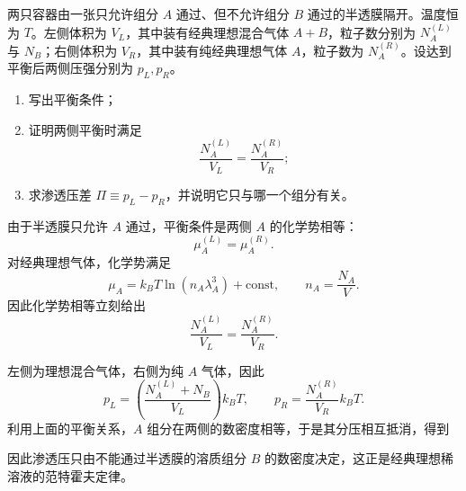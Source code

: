 \begin{question}
两只容器由一张只允许组分 $A$ 通过、但不允许组分 $B$ 通过的半透膜隔开。温度恒为 $T$。左侧体积为 $V_L$，其中装有经典理想混合气体 $A+B$，粒子数分别为 $N_A^{(L)}$ 与 $N_B$；右侧体积为 $V_R$，其中装有纯经典理想气体 $A$，粒子数为 $N_A^{(R)}$。设达到平衡后两侧压强分别为 $p_L,p_R$。

\begin{enumerate}[label=(\arabic*),leftmargin=2.5em]
  \item 写出平衡条件；
  \item 证明两侧平衡时满足
  \[
  \frac{N_A^{(L)}}{V_L}=\frac{N_A^{(R)}}{V_R};
  \]
  \item 求渗透压差 $\Pi\equiv p_L-p_R$，并说明它只与哪一个组分有关。
\end{enumerate}

\begin{solution}
由于半透膜只允许 $A$ 通过，平衡条件是两侧 $A$ 的化学势相等：
\[
\mu_A^{(L)}=\mu_A^{(R)}.
\]
对经典理想气体，化学势满足
\[
\mu_A=k_B T\ln(n_A\lambda_A^3)+\text{const},
\qquad n_A=\frac{N_A}{V}.
\]
因此化学势相等立刻给出
\[
\frac{N_A^{(L)}}{V_L}=\frac{N_A^{(R)}}{V_R}.
\]

左侧为理想混合气体，右侧为纯 $A$ 气体，因此
\[
p_L=\left(\frac{N_A^{(L)}+N_B}{V_L}\right)k_B T,
\qquad
p_R=\frac{N_A^{(R)}}{V_R}k_B T.
\]
利用上面的平衡关系，$A$ 组分在两侧的数密度相等，于是其分压相互抵消，得到

因此渗透压只由不能通过半透膜的溶质组分 $B$ 的数密度决定，这正是经典理想稀溶液的范特霍夫定律。
\end{solution}
\end{question}

